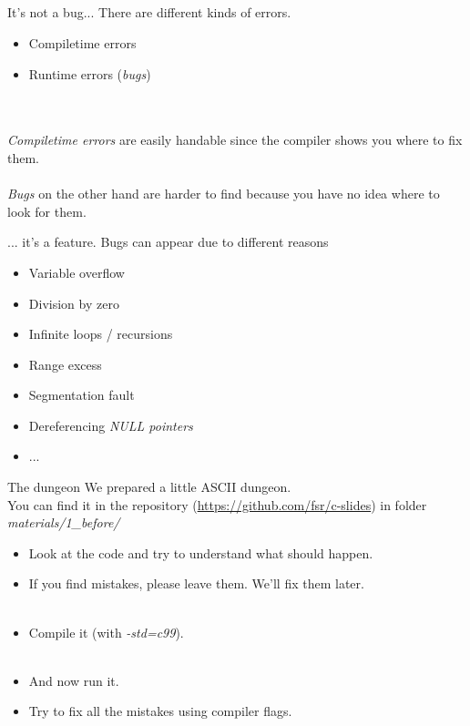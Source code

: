 \subsection{}
\begin{frame}{It's not a bug...}
	There are different kinds of errors.
	\begin{itemize}
		\item Compiletime errors
		\item Runtime errors (\textit{bugs})
	\end{itemize}\ \\\ \\
	\textit{Compiletime errors} are easily handable since the compiler shows you where to fix them.\\\ \\
	\textit{Bugs} on the other hand are harder to find because you have no idea where to look for them.
\end{frame}
\begin{frame}{... it's a feature.}
	Bugs can appear due to different reasons
	\begin{itemize}
		\item Variable overflow
		\item Division by zero
		\item Infinite loops / recursions
		\item Range excess
		\item Segmentation fault
		\item Dereferencing \textit{NULL pointers}
		\item ...
	\end{itemize}
\end{frame}
\begin{frame}{The dungeon}
	We prepared a little ASCII dungeon.\\
	You can find it in the repository (\url{https://github.com/fsr/c-slides}) in folder \textit{materials/1\_before/}\\
	\begin{itemize}
		\item Look at the code and try to understand what should happen.
		\item If you find mistakes, please leave them. We'll fix them later.
		\\\ 
		\item Compile it (with \textit{-std=c99}).
		\\\ 
		\item And now run it.
		\pause
		\item Try to fix all the mistakes using compiler flags.
	\end{itemize}
\end{frame}

